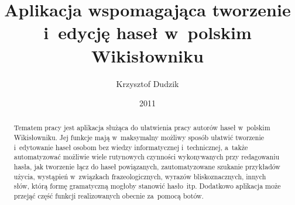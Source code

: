 \documentclass{pracamgr}
\author{Krzysztof Dudzik}
\title{Aplikacja wspomagająca tworzenie i~edycję haseł w~polskim Wikisłowniku}
\date{2011}
\begin{document}
\maketitle

\begin{abstract}
  Tematem pracy jest aplikacja służąca do ułatwienia pracy autorów haseł w~polskim Wikisłowniku. Jej funkcje mają w~maksymalny możliwy sposób ułatwić tworzenie i~edytowanie haseł osobom bez wiedzy informatycznej i~technicznej, a~także automatyzować możliwie wiele rutynowych czynności wykonywanych przy redagowaniu hasła, jak tworzenie łącz do haseł powiązanych, zautomatyzowane szukanie przykładów użycia, wystąpień w~związkach frazeologicznych, wyrazów bliskoznacznych, innych słów, którą formę gramatyczną mogłoby stanowić hasło~itp. Dodatkowo aplikacja może przejąć część funkcji realizowanych obecnie za~pomocą botów.
\end{abstract}

\tableofcontents
\end{document}

